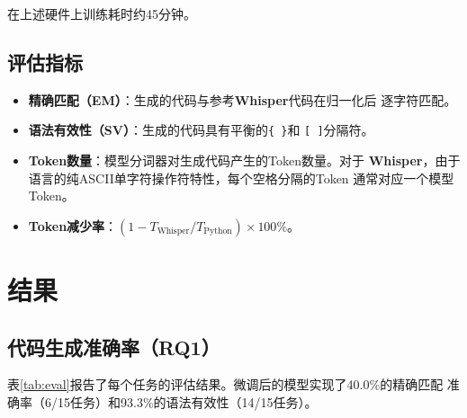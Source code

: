 \documentclass[11pt,a4paper]{ctexart}
\begin{document}
在上述硬件上训练耗时约45分钟。

\subsection{评估指标}

\begin{itemize}
\item \textbf{精确匹配（EM）}：生成的代码与参考\textbf{Whisper}代码在归一化后
  逐字符匹配。
\item \textbf{语法有效性（SV）}：生成的代码具有平衡的\texttt{\{ \}}和
  \texttt{[ ]}分隔符。
\item \textbf{Token数量}：模型分词器对生成代码产生的Token数量。对于
  \textbf{Whisper}，由于语言的纯ASCII单字符操作符特性，每个空格分隔的Token
  通常对应一个模型Token。
\item \textbf{Token减少率}：$(1 - T_{\text{Whisper}} /
  T_{\text{Python}}) \times 100\%$。
\end{itemize}

\section{结果}
\label{sec:results}

\subsection{代码生成准确率（RQ1）}

表\ref{tab:eval}报告了每个任务的评估结果。微调后的模型实现了40.0\%的精确匹配
准确率（6/15任务）和93.3\%的语法有效性（14/15任务）。
\end{document}
